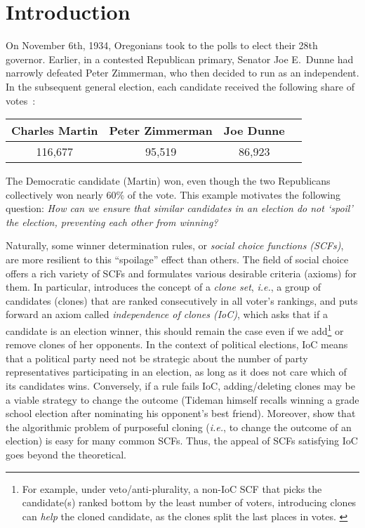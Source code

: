 \section{Introduction}\label{sec:intro}

On November 6th, 1934, Oregonians took to the polls to elect their 28th governor. Earlier, in a contested Republican primary, Senator Joe E.~Dunne had narrowly defeated Peter Zimmerman, who then decided to run as an independent.
In the subsequent general election, each candidate received the following share of votes~\citep{Needham21:1934}:
\begin{center}
    \begin{tabular}{ |c|c|c|c| } 
    \hline
    Charles Martin & Peter Zimmerman & Joe Dunne \\
    \hline
    116,677 & 95,519 & 86,923 \\ 

    \hline
    \end{tabular}
\end{center}
The Democratic candidate (Martin) won, even though the two Republicans collectively won nearly $60\%$ of the vote. This example motivates the following question: \textit{How can we ensure that similar candidates in an election do not `spoil' the election, preventing each other from winning?}


Naturally, some winner determination rules, or \emph{social choice functions (SCFs)}, are more resilient
to this ``spoilage'' effect than others. 
The field of social choice offers a rich variety of SCFs and formulates various desirable criteria
(axioms) for them. In particular, \citet{Tideman87:Independence} introduces the concept of a {\em clone set}, \emph{i.e.}, a group of candidates (clones) that are ranked consecutively in all voter's rankings, and puts forward an axiom called \emph{independence of clones (IoC)}, which asks 
that if a candidate is an election winner, this should remain the case even if we add\footnote{For example, under veto/anti-plurality, a non-IoC SCF that picks the candidate(s) ranked bottom by the least number of voters, introducing clones can {\em help} the cloned candidate, as the clones split the last places in votes. \label{footnote:veto}} or remove clones of her opponents. In the context of political elections, IoC means that a political party need not be strategic about the number of party representatives participating in an election, as long as it does not care which of its candidates wins. Conversely, if a rule fails IoC, adding/deleting clones may be a viable strategy to change the outcome (Tideman himself recalls winning a grade school election after nominating his opponent's best friend). Moreover, \citet{Elkind11:Cloning} show that the algorithmic problem of purposeful cloning (\emph{i.e.}, to change the outcome of an election) is easy for many common SCFs. Thus, the appeal of SCFs satisfying IoC goes beyond the theoretical.

